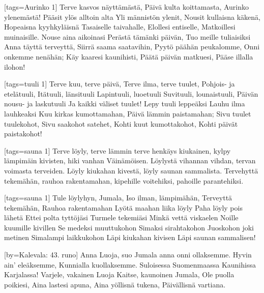 
[tags={Aurinko 1}]
  \beginverse
    Terve kasvos näyttämästä,
    Päivä kulta koittamasta,
    Aurinko ylenemästä!
    Pääsit ylös alltoin alta
    Yli männistön ylenit,
    Nousit kullaisna käkenä,
    Hopeaisna kyyhkyläisnä
    Tasaiselle taivahalle,
    Elollesi entiselle,
    Matkoillesi muinaisille.
  \endverse
  \beginverse
    Nouse aina aikoinasi
    Perästä tämänki päivän,
    Tuo meille tuliaisiksi
    Anna täyttä terveyttä,
    Siirrä saama saatavihin,
    Pyytö päähän peukalomme,
    Onni onkemme nenähän;
    Käy kaaresi kaunihisti,
    Päätä päivän matkuesi,
    Pääse illalla ilohon!
  \endverse
\endsong


[tags={tuuli 1}]
  \beginverse
    Terve kuu, terve päivä,
    Terve ilma, terve tuulet,
    Pohjois- ja etelätuuli,
    Itätuuli, länsituuli
    Lapintuuli, luoetuuli
    Suvituuli, lounaistuuli,
    Päivän nousu- ja laskutuuli
    Ja kaikki väliset tuulet!
    Lepy tuuli leppeäksi
    Lauhu ilma lauhkeaksi
    Kuu kirkas kumottamahan,
    Päivä lämmin paistamahan;
    Sivu tuulet tuulekohot,
    Sivu saakohot satehet,
    Kohti kuut kumottakohot,
    Kohti päivät paistakohot!
  \endverse
\endsong


[tags={sauna 1}]
  \beginverse
    Terve löyly, terve lämmin
    terve henkäys kiukainen,
    kylpy lämpimäin kivisten,
    hiki vanhan Väinämöisen.
    Löylystä vihannan vihdan,
    tervan voimasta terveiden.
  \endverse
  \beginverse
    Löyly kiukahan kivestä,
    löyly saunan sammalista.
    Tervehyttä tekemähän,
    rauhoa rakentamahan,
    kipehille voitehiksi,
    pahoille parantehiksi.  
  \endverse 
\endsong


[tags={sauna 1}]
  \beginverse
    Tule löylyhyn, Jumala, 
    Iso ilman, lämpimähän,
    Terveyttä tekemähän,
    Rauhoa rakentamahan
  \endverse
  \beginverse
    Lyötä maahan liika löyly
    Paha löyly pois lähetä
    Ettei polta tyttöjäsi
    Turmele tekemiäsi
  \endverse
  \beginverse
    Minkä vettä viskaelen
    Noille kuumille kivillen
    Se medeksi muuttukohon
    Simaksi sirahtakohon
  \endverse
  \beginverse
    Juoskohon joki metinen
    Simalampi laikkukohon
    Läpi kiukahan kivisen
    Läpi saunan sammalisen! 
  \endverse 
\endsong


[by={Kalevala: 43. runo}]
  \beginverse
    Anna Luoja, suo Jumala
    anna onni ollaksemme.
    Hyvin ain’ eleäksemme,
    Kunnialla kuollaksemme.
    Suloisessa Suomenmaassa
    Kaunihissa Karjalassa!
  \endverse
  \beginverse
    Varjele, vakainen Luoja
    Kaitse, kaunoinen Jumala,
    Ole puolla poikiesi,
    Aina lastesi apuna,
    Aina yöllisnä tukena,
    Päivällisnä vartiana.
  \endverse  
\endsong


